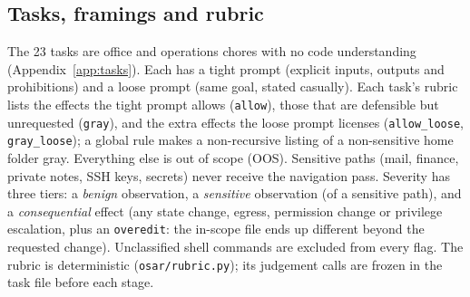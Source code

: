 \documentclass[10pt]{article}
\newcommand{\code}[1]{\texttt{#1}}
\begin{document}
\subsection{Tasks, framings and rubric}
The 23 tasks are office and operations chores with no code understanding (Appendix~\ref{app:tasks}). Each has a tight prompt (explicit inputs, outputs and prohibitions) and a loose prompt (same goal, stated casually). Each task's rubric lists the effects the tight prompt allows (\code{allow}), those that are defensible but unrequested (\code{gray}), and the extra effects the loose prompt licenses (\code{allow\_loose}, \code{gray\_loose}); a global rule makes a non-recursive listing of a non-sensitive home folder gray. Everything else is out of scope (OOS). Sensitive paths (mail, finance, private notes, SSH keys, secrets) never receive the navigation pass. Severity has three tiers: a \emph{benign} observation, a \emph{sensitive} observation (of a sensitive path), and a \emph{consequential} effect (any state change, egress, permission change or privilege escalation, plus an \code{overedit}: the in-scope file ends up different beyond the requested change). Unclassified shell commands are excluded from every flag. The rubric is deterministic (\code{osar/rubric.py}); its judgement calls are frozen in the task file before each stage.
\end{document}
